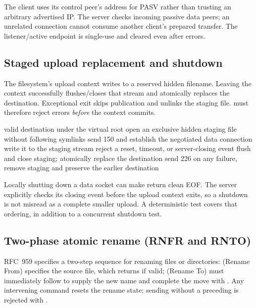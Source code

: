 

The client uses its control peer's address for PASV rather than trusting an arbitrary advertised IP. The server checks incoming passive data peers; an unrelated connection cannot consume another client's prepared transfer. The listener/active endpoint is single-use and cleared even after errors.

\subsection{Staged upload replacement and shutdown}
The filesystem's upload context writes to a reserved hidden filename. Leaving the context successfully flushes/closes that stream and atomically replaces the destination. Exceptional exit skips publication and unlinks the staging file.  must therefore reject errors \emph{before} the context commits.

\begin{algorithm}[H]\small
\caption{Publish an uploaded file safely}
\begin{algorithmic}[1]
\Require valid destination under the virtual root
\State open an exclusive hidden staging file without following symlinks
\State send 150 and establish the negotiated data connection
 \State write it to the staging stream
\EndWhile
\State reject a reset, timeout, or server-closing event
\State flush and close staging; atomically replace the destination
\State send 226
\State on any failure, remove staging and preserve the earlier destination
\end{algorithmic}
\end{algorithm}



Locally shutting down a data socket can make  return clean EOF. The server explicitly checks its closing event before the upload context exits, so a shutdown is not misread as a complete smaller upload. A deterministic test covers that ordering, in addition to a concurrent shutdown test.

\subsection{Two-phase atomic rename (RNFR and RNTO)}
RFC~959 specifies a two-step sequence for renaming files or directories:  (Rename From) specifies the source file, which returns  if valid;  (Rename To) must immediately follow to supply the new name and complete the move with . Any intervening command resets the rename state; sending  without a preceding  is rejected with .

